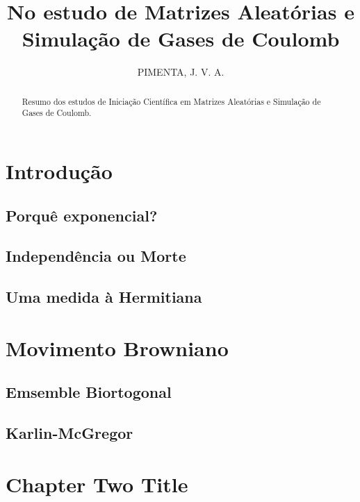 \documentclass[11pt,oneside,a4paper]{report}
\title{
	{No estudo de Matrizes Aleatórias e Simulação de Gases de Coulomb}\\
}
\author{PIMENTA, J. V. A.}
\begin{document}
\maketitle

\begin{abstract}
	Resumo dos estudos de Iniciação Científica em Matrizes Aleatórias e Simulação de Gases de Coulomb.
\end{abstract}

\tableofcontents

\chapter{Introdução}


\section{Porquê exponencial?}


\section{Independência ou Morte}


\section{Uma medida à Hermitiana}


\chapter{Movimento Browniano}


\section{Emsemble Biortogonal}


\section{Karlin-McGregor}


\chapter{Chapter Two Title}

\end{document}
